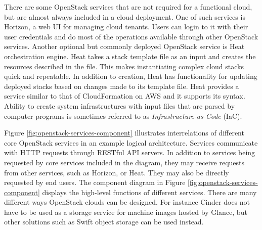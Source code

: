 There are some OpenStack services that are not required for a functional cloud,
but are almost always included in a cloud deployment. One of such services is
Horizon, a web UI for managing cloud tenants. Users can login to it with their
user credentials and do most of the operations available through other
OpenStack services. Another optional but commonly deployed OpenStack service is
Heat orchestration engine. Heat takes a stack template file as an input and
creates the resources described in the file. This makes instantiating complex
cloud stacks quick and repeatable. In addition to creation, Heat has
functionality for updating deployed stacks based on changes made to its
template file. Heat provides a service similar to that of CloudFormation on AWS
and it supports its syntax. Ability to create system infrastructures with input
files that are parsed by computer programs is sometimes referred to as
\textit{Infrastructure-as-Code} (IaC).

Figure \ref{fig:openstack-services-component} illustrates interrelations of
different core OpenStack services in an example logical architecture. Services
communicate with HTTP requests through RESTful API servers. In addition to
services being requested by core services included in the diagram, they may
receive requests from other services, such as Horizon, or Heat. They may also
be directly requested by end users. The component diagram in Figure
\ref{fig:openstack-services-component} displays the high-level functions of
different services. There are many different ways OpenStack clouds can be
designed. For instance Cinder does not have to be used as a storage service
for machine images hosted by Glance, but other solutions such as Swift object
storage can be used instead.

